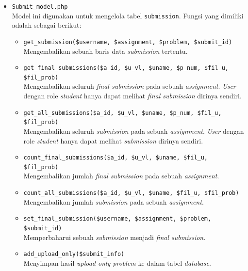 \documentclass[a4paper,twoside]{article}
\begin{document}
\begin{enumerate}
\begin{itemize}
\begin{itemize}
			            \item \verb|Submit_model.php| \\
			                  Model ini digunakan untuk mengelola tabel \verb|submission|. Fungsi yang dimiliki adalah sebagai berikut:

			                  \begin{itemize}
				                  \item \verb|get_submission($username, $assignment, $problem, $submit_id)| \\
				                        Mengembalikan sebuah baris data \textit{submission} tertentu.
				                  \item \verb|get_final_submissions($a_id, $u_vl, $uname, $p_num, $fil_u, $fil_prob)| \\
				                        Mengembalikan seluruh \textit{final submission} pada sebuah \textit{assignment}. \textit{User} dengan role \textit{student} hanya dapat melihat \textit{final submission} dirinya sendiri.
				                  \item \verb|get_all_submissions($a_id, $u_vl, $uname, $p_num, $fil_u, $fil_prob)| \\
				                        Mengembalikan seluruh \textit{submission} pada sebuah \textit{assignment}. \textit{User} dengan role \textit{student} hanya dapat melihat \textit{submission} dirinya sendiri.
				                  \item \verb|count_final_submissions($a_id, $u_vl, $uname, $fil_u, $fil_prob)| \\
				                        Mengembalikan jumlah \textit{final submission} pada sebuah \textit{assignment}.
				                  \item \verb|count_all_submissions($a_id, $u_vl, $uname, $fil_u, $fil_prob)| \\
				                        Mengembalikan jumlah \textit{submission} pada sebuah \textit{assignment}.
				                  \item \verb|set_final_submission($username, $assignment, $problem, $submit_id)| \\
				                        Memperbaharui sebuah \textit{submission} menjadi \textit{final submission}.
				                  \item \verb|add_upload_only($submit_info)| \\
				                        Menyimpan hasil \textit{upload only problem} ke dalam tabel \textit{database}.
			                  \end{itemize}


\end{itemize}
\end{itemize}
\end{enumerate}
\end{document}
